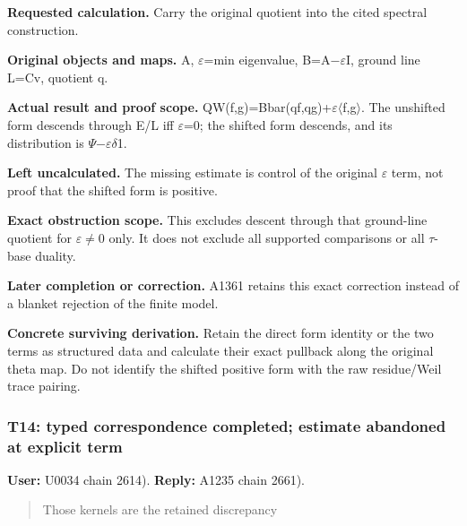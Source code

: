 \textbf{Requested calculation.} Carry the original quotient into the
cited spectral construction.

\textbf{Original objects and maps.} A,
\allowbreak{}\ensuremath{ε}\allowbreak{}=min eigenvalue,
B=A\allowbreak{}\ensuremath{−}\allowbreak{}\allowbreak{}\ensuremath{ε}\allowbreak{}I,
ground line L=Cv, quotient q.

\textbf{Actual result and proof scope.}
QW(f,g)=Bbar(qf,qg)+\allowbreak{}\ensuremath{ε}\allowbreak{}\allowbreak{}\ensuremath{\langle}\allowbreak{}f,g\allowbreak{}\ensuremath{\rangle}\allowbreak{}.
The unshifted form descends through E/L iff
\allowbreak{}\ensuremath{ε}\allowbreak{}=0; the shifted form descends,
and its distribution is
\allowbreak{}\ensuremath{Ψ}\allowbreak{}\allowbreak{}\ensuremath{−}\allowbreak{}\allowbreak{}\ensuremath{ε}\allowbreak{}\allowbreak{}\ensuremath{δ}\allowbreak{}1.

\textbf{Left uncalculated.} The missing estimate is control of the
original \allowbreak{}\ensuremath{ε}\allowbreak{} term, not proof that
the shifted form is positive.

\textbf{Exact obstruction scope.} This excludes descent through that
ground-line quotient for
\allowbreak{}\ensuremath{ε}\allowbreak{}\allowbreak{}\ensuremath{≠}\allowbreak{}0
only. It does not exclude all supported comparisons or all
\allowbreak{}\ensuremath{τ}\allowbreak{}-base duality.

\textbf{Later completion or correction.} A1361 retains this exact
correction instead of a blanket rejection of the finite model.

\textbf{Concrete surviving derivation.} Retain the direct form identity
or the two terms as structured data and calculate their exact pullback
along the original theta map. Do not identify the shifted positive form
with the raw residue/Weil trace pairing.

\subsubsection{T14: typed correspondence completed; estimate abandoned
at explicit
term}\label{TranscriptLedgerStage:t14-typed-correspondence-completed-estimate-abandoned-at-explicit-term}

\textbf{User:} U0034
\protect{} chain 2614).
\textbf{Reply:} A1235
\protect{} chain 2661).

\begin{quote}
Those kernels are the retained discrepancy
\end{quote}

